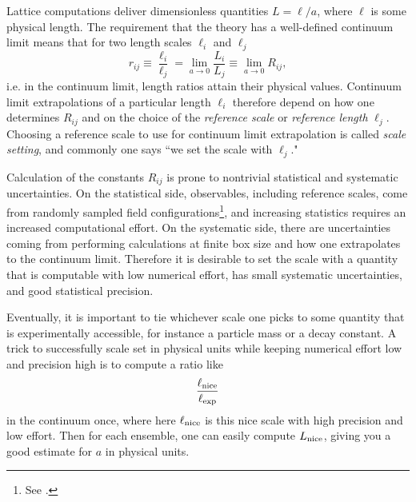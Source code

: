 Lattice computations deliver dimensionless quantities $L=\ell/a$, where 
$\ell$ is some physical length. The requirement that the theory has a 
well-defined continuum limit means that for two length scales 
$\ell_i$ and $\ell_j$
\begin{equation}
  r_{ij}\equiv\frac{\ell_i}{\ell_j}=\lim_{a\to 0}\frac{L_i}{L_j}
        \equiv\lim_{a\to 0}R_{ij},
\end{equation}
i.e. in the continuum limit, length ratios attain their physical values.
Continuum limit extrapolations of a particular length $\ell_i$ therefore
depend on how one determines $R_{ij}$ and on the choice of the
{\it reference scale} or {\it reference length} $\ell_j$. 
Choosing a reference scale to use for continuum limit extrapolation
is called {\it scale setting}, and commonly one says
``we set the scale with $\ell_j$."


Calculation of the constants $R_{ij}$ is prone to nontrivial statistical and
systematic uncertainties. On the statistical side, observables, including
reference scales, come from randomly sampled field 
configurations\footnote{See .}, and increasing statistics
requires an increased computational effort. On the systematic side, there are
uncertainties coming from performing calculations at finite box size and how one
extrapolates to the continuum limit. Therefore it is desirable to set
the scale with a quantity that is computable with low numerical effort,
has small systematic uncertainties, and good statistical precision.


Eventually, it is important to tie whichever scale one picks to some
quantity that is experimentally accessible, for instance a particle
mass or a decay constant. A trick to successfully scale set in physical
units while keeping numerical effort low and precision high is to
compute a ratio like
\begin{equation}
\frac{\ell_{\rm nice}}{\ell_{\rm exp}}
\end{equation}
in the continuum once, where here $\ell_{\rm nice}$ is this nice scale with
high precision and low effort. Then for each ensemble, one can
easily compute $L_{\rm nice}$, giving you a good estimate for $a$ in physical units.



